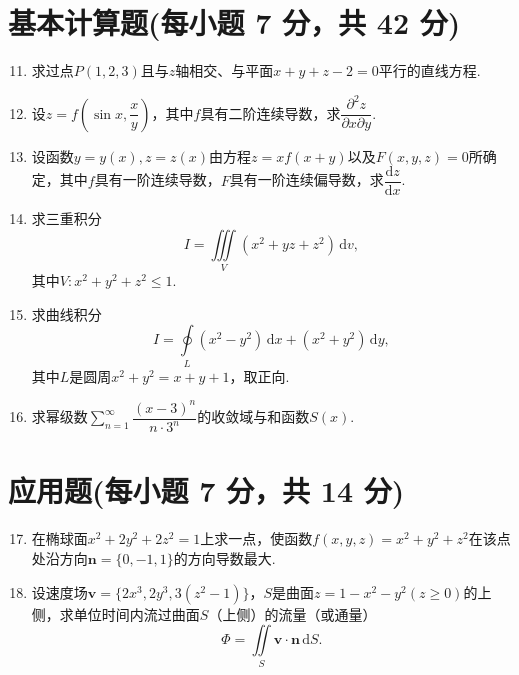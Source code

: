 \documentclass[../Main.tex]{subfiles}
\begin{document}
\section{基本计算题(每小题 7 分，共 42 分)}
\begin{enumerate}
  \setcounter{enumi}{10}
  \item 求过点$P(1,2,3)$且与$z$轴相交、与平面$x+y+z-2=0$平行的直线方程.
        \vspace{11em}

  \item 设$z=f\left(\sin x,\dfrac{x}{y}\right)$，其中$f$具有二阶连续导数，求$\dfrac{\partial^{2}z}{\partial x\partial y}$.
        \vspace{12em}

  \item 设函数$y=y(x),z=z(x)$由方程$z=xf(x+y)$以及$F(x,y,z)=0$所确定，其中$f$具有一阶连续导数，$F$具有一阶连续偏导数，求$\dfrac{\mathrm{d}z}{\mathrm{d}x}$.
        \vspace{13em}

  \item 求三重积分
        \[
          I=\iiint\limits_{V}(x^{2}+yz+z^{2})\,\mathrm{d}v,
        \]
        其中$V:x^{2}+y^{2}+z^{2}\leq1$.
        \vspace{12em}

  \item 求曲线积分
        \[
          I=\oint\limits_{L}(x^{2}-y^{2})\,\mathrm{d}x+(x^{2}+y^{2})\,\mathrm{d}y,
        \]
        其中$L$是圆周$x^{2}+y^{2}=x+y+1$，取正向.
        \vspace{12em}

  \item 求幂级数$\displaystyle\sum_{n=1}^{\infty}\dfrac{(x-3)^{n}}{n\cdot3^{n}}$的收敛域与和函数$S(x)$.
        \vspace{13em}
\end{enumerate}

\section{应用题(每小题 7 分，共 14 分)}
\begin{enumerate}
  \setcounter{enumi}{16}
  \item 在椭球面$x^{2}+2y^{2}+2z^{2}=1$上求一点，使函数$f(x,y,z)=x^{2}+y^{2}+z^{2}$在该点处沿方向$\boldsymbol{n}=\{0,-1,1\}$的方向导数最大.
        \vspace{12em}

  \item 设速度场$\boldsymbol{v}=\{2x^{3},2y^{3},3(z^{2}-1)\}$，$S$是曲面$z=1-x^{2}-y^{2}(z\geq0)$的上侧，求单位时间内流过曲面$S$（上侧）的流量（或通量）
        \[
          \Phi=\iint\limits_{S}\boldsymbol{v}\cdot\boldsymbol{n}\,\mathrm{d}S.
        \]
        \vspace{12em}
\end{enumerate}
\end{document}
